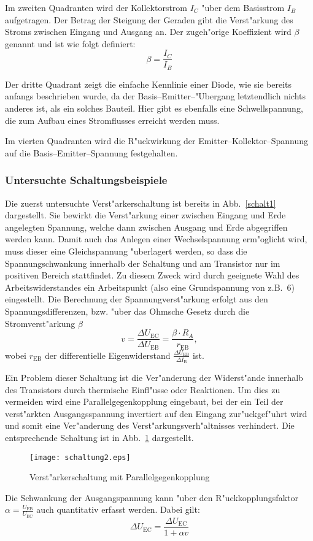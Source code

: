 \documentclass[a4paper,10pt]{article}
\begin{document}
Im zweiten Quadranten wird der Kollektorstrom $I_C$ "uber dem Basisstrom $I_B$ aufgetragen. Der Betrag der Steigung der Geraden gibt die Verst"arkung des Stroms zwischen Eingang und Ausgang an. Der zugeh"orige Koeffizient wird $\beta$ genannt und ist wie folgt definiert:
\begin{equation}
\beta = \frac{I_C}{I_B} \label{statStr}
\end{equation}

Der dritte Quadrant zeigt die einfache Kennlinie einer Diode, wie sie bereits  anfangs beschrieben wurde, da der Basis--Emitter--"Ubergang letztendlich nichts anderes ist, als ein solches Bauteil. Hier gibt es ebenfalls eine Schwellspannung, die zum Aufbau eines Stromflusses erreicht werden muss.

Im vierten Quadranten wird die R"uckwirkung der Emitter--Kollektor--Spannung auf die Basis--Emitter--Spannung festgehalten.

\subsubsection*{Untersuchte Schaltungsbeispiele}
Die zuerst untersuchte Verst"arkerschaltung ist bereits in Abb.~\ref{schalt1} dargestellt. Sie bewirkt die Verst"arkung einer zwischen Eingang und Erde angelegten Spannung, welche dann zwischen Ausgang und Erde abgegriffen werden kann. Damit auch das Anlegen einer Wechselspannung erm"oglicht wird, muss dieser eine Gleichspannung "uberlagert werden, so dass die Spannungschwankung innerhalb der Schaltung und am Transistor nur im positiven Bereich stattfindet. Zu diesem Zweck wird durch geeignete Wahl des Arbeitswiderstandes ein Arbeitspunkt (also eine Grundspannung von z.B.~\unit{6}{\volt}) eingestellt. Die Berechnung der Spannungverst"arkung erfolgt aus den Spannungsdifferenzen, bzw. "uber das Ohmsche Gesetz durch die Stromverst"arkung $\beta$
\begin{equation}
v = \frac{\Delta U_\text{EC}}{\Delta U_\text{EB}} = \frac{\beta \cdot R_A}{r_\text{EB}},
\end{equation}
wobei $r_\text{EB}$ der differentielle Eigenwiderstand $\frac{\Delta U_\text{EB}}{\Delta I_\text{B}}$ ist.

Ein Problem dieser Schaltung ist die Ver"anderung der Widerst"ande innerhalb des Transistors durch thermische Einfl"usse oder Reaktionen. Um dies zu vermeiden wird eine Parallelgegenkopplung eingebaut, bei der ein Teil der verst"arkten Ausgangsspannung invertiert auf den Eingang zur"uckgef"uhrt wird und somit eine Ver"anderung des Verst"arkungsverh"altnisses verhindert. Die entsprechende Schaltung ist in Abb.~\ref{schalt2} dargestellt.
\begin{figure}[htb]
	\centering
	\texttt{[image: schaltung2.eps]}
	\caption{Verst"arkerschaltung mit Parallelgegenkopplung}
	\label{schalt2}
\end{figure}
Die Schwankung der Ausgangspannung kann "uber den R"uckkopplungsfaktor $\alpha = \frac{U_\text{EB}}{U_\text{EC}}$ auch quantitativ erfasst werden. Dabei gilt:
\begin{equation}
\Delta U_\text{EC} = \frac{\Delta U_\text{EC}}{1 + \alpha v}
\end{equation}
\end{document}
